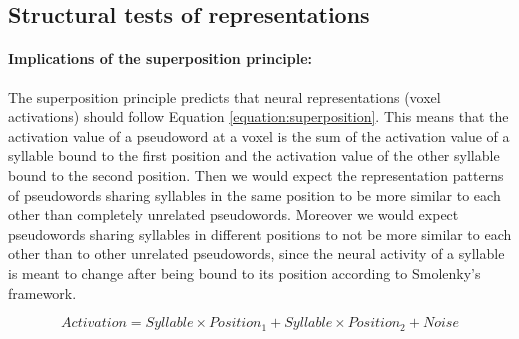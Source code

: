 \subsection{Structural tests of representations}
\label{sec:methods_structural}

\paragraph{Implications of the superposition principle:}
The superposition principle predicts that neural representations (voxel activations) should follow Equation \ref{equation:superposition}.
This means that the activation value of a pseudoword at a voxel is the sum of the activation value of a syllable bound to the first position and the activation value of the other syllable bound to the second position.
Then we would expect the representation patterns of pseudowords sharing syllables in the same position to be more similar to each other than completely unrelated pseudowords.
Moreover we would expect pseudowords sharing syllables in different positions to not be more similar to each other than to other unrelated pseudowords, since the neural activity of a syllable is meant to change after being bound to its position according to Smolenky's framework.

\begin{equation}
Activation = Syllable \times Position_1 + Syllable \times Position_2 + Noise
\label{equation:superposition}
\end{equation}


